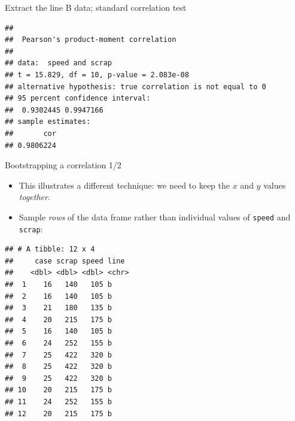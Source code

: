 \documentclass[
  ignorenonframetext,
]{beamer}
\newenvironment{Shaded}{\begin{snugshade}}{\end{snugshade}}
\newcommand{\DataTypeTok}[1]{\textcolor[rgb]{0.13,0.29,0.53}{#1}}
\newcommand{\KeywordTok}[1]{\textcolor[rgb]{0.13,0.29,0.53}{\textbf{#1}}}
\newcommand{\NormalTok}[1]{#1}
\newcommand{\OperatorTok}[1]{\textcolor[rgb]{0.81,0.36,0.00}{\textbf{#1}}}
\newcommand{\StringTok}[1]{\textcolor[rgb]{0.31,0.60,0.02}{#1}}
\providecommand{\tightlist}{%
  \setlength{\itemsep}{0pt}\setlength{\parskip}{0pt}}
\begin{document}
\begin{frame}[fragile]{Extract the line B data; standard correlation
test}
\protect\hypertarget{extract-the-line-b-data-standard-correlation-test}{}

\begin{Shaded}
\end{Shaded}

\begin{verbatim}
## 
##  Pearson's product-moment correlation
## 
## data:  speed and scrap
## t = 15.829, df = 10, p-value = 2.083e-08
## alternative hypothesis: true correlation is not equal to 0
## 95 percent confidence interval:
##  0.9302445 0.9947166
## sample estimates:
##       cor 
## 0.9806224
\end{verbatim}

\end{frame}

\begin{frame}[fragile]{Bootstrapping a correlation 1/2}
\protect\hypertarget{bootstrapping-a-correlation-12}{}

\begin{itemize}
\tightlist
\item
  This illustrates a different technique: we need to keep the \(x\) and
  \(y\) values \emph{together}.
\item
  Sample \emph{rows} of the data frame rather than individual values of
  \texttt{speed} and \texttt{scrap}:
\end{itemize}

\scriptsize

\begin{Shaded}
\end{Shaded}

\begin{verbatim}
## # A tibble: 12 x 4
##     case scrap speed line 
##    <dbl> <dbl> <dbl> <chr>
##  1    16   140   105 b    
##  2    16   140   105 b    
##  3    21   180   135 b    
##  4    20   215   175 b    
##  5    16   140   105 b    
##  6    24   252   155 b    
##  7    25   422   320 b    
##  8    25   422   320 b    
##  9    25   422   320 b    
## 10    20   215   175 b    
## 11    24   252   155 b    
## 12    20   215   175 b
\end{verbatim}

\normalsize

\end{frame}
\end{document}
